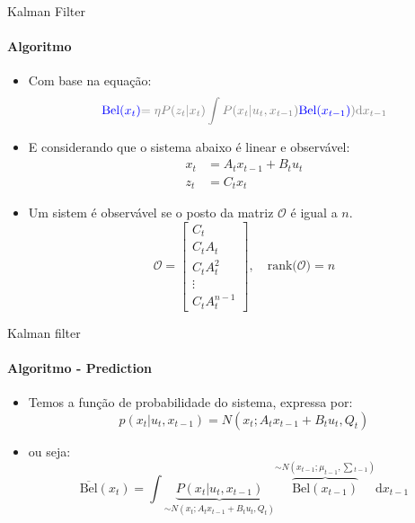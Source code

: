\documentclass[aspectratio=169]{beamer}
\begin{document}
\begin{frame}[c]{Kalman Filter}
    \framesubtitle{Algoritmo}
    \begin{itemize}
        \item Com base na equação:
        \begin{equation*}
            \color{blue}{\text{Bel}}(x_t)  \color{gray}{=\eta P(z_t|x_t)\displaystyle\int P(x_t| u_t,x_{t-1})}\color{blue}{\color{blue}{\text{Bel}}(x_{t-1})}\color{gray}{)\text{d}x_{t-1}}
        \end{equation*}
        \item E considerando que o sistema abaixo é linear e observável:
        \begin{equation*}
            \begin{split}
                x_t &= A_t x_{t-1} + B_t u_t\\ 
                z_t &= C_t x_t
            \end{split}
        \end{equation*}
        \item Um sistem é observável se o posto da matriz $\mathcal {O}$ é igual a $n$.
        \begin{equation*}
            \mathcal {O}={\begin{bmatrix}C_t\\C_tA_t\\C_tA^{2}_t\\\vdots \\C_tA^{n-1}_t\end{bmatrix}, \quad \text{rank}(\mathcal {O}}) = n
        \end{equation*}
    \end{itemize}
\end{frame}


\begin{frame}[c]{Kalman filter}
    \framesubtitle{Algoritmo - Prediction}
    \begin{itemize}
        \item Temos a função de probabilidade do sistema, expressa por:
        \begin{equation*}
            p(x_t| u_t, x_{t-1})= N\left(x_t; A_tx_{t-1}+ B_tu_t, Q_t\right)
        \end{equation*}   
        \item ou seja:
        \begin{equation*}
            \overline{\text{Bel}}(x_t)  = \displaystyle\int\underbrace{P(x_t|u_t, x_{t-1})}_{\sim N\left(x_t; A_t x_{t-1}+ B_tu_t, Q_t\right)} \overbrace{\text{Bel}(x_{t-1})}^{\sim N\left(x_{t-1}; \mu_{t-1}, \textstyle\sum {}_{t-1}\right)}\text{d}x_{t-1}
        \end{equation*}
    \end{itemize}
\end{frame}
\end{document}
